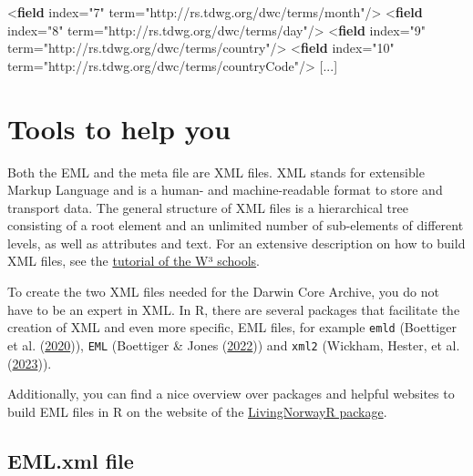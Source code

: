 \documentclass[
]{book}
\newenvironment{Shaded}{\begin{snugshade}}{\end{snugshade}}
\newcommand{\KeywordTok}[1]{\textcolor[rgb]{0.13,0.29,0.53}{\textbf{#1}}}
\newcommand{\NormalTok}[1]{#1}
\newcommand{\OtherTok}[1]{\textcolor[rgb]{0.56,0.35,0.01}{#1}}
\newcommand{\StringTok}[1]{\textcolor[rgb]{0.31,0.60,0.02}{#1}}
\begin{document}
\begin{Shaded}
\begin{Highlighting}[]
\NormalTok{    \textless{}}\KeywordTok{field}\OtherTok{ index=}\StringTok{"7"}\OtherTok{ term=}\StringTok{"http://rs.tdwg.org/dwc/terms/month"}\NormalTok{/\textgreater{}}
\NormalTok{    \textless{}}\KeywordTok{field}\OtherTok{ index=}\StringTok{"8"}\OtherTok{ term=}\StringTok{"http://rs.tdwg.org/dwc/terms/day"}\NormalTok{/\textgreater{}}
\NormalTok{    \textless{}}\KeywordTok{field}\OtherTok{ index=}\StringTok{"9"}\OtherTok{ term=}\StringTok{"http://rs.tdwg.org/dwc/terms/country"}\NormalTok{/\textgreater{}}
\NormalTok{    \textless{}}\KeywordTok{field}\OtherTok{ index=}\StringTok{"10"}\OtherTok{ term=}\StringTok{"http://rs.tdwg.org/dwc/terms/countryCode"}\NormalTok{/\textgreater{}}
\NormalTok{    [...]}
\end{Highlighting}
\end{Shaded}

\hypertarget{tools-to-help-you-5}{%
\section{Tools to help you}\label{tools-to-help-you-5}}

Both the EML and the meta file are XML files. XML stands for extensible Markup Language and is a human- and machine-readable format to store and transport data. The general structure of XML files is a hierarchical tree consisting of a root element and an unlimited number of sub-elements of different levels, as well as attributes and text. For an extensive description on how to build XML files, see the \href{https://www.w3schools.com/xml/default.asp}{tutorial of the W³ schools}.

To create the two XML files needed for the Darwin Core Archive, you do not have to be an expert in XML. In R, there are several packages that facilitate the creation of XML and even more specific, EML files, for example \texttt{emld} (Boettiger et al. (\protect\hyperlink{ref-R-emld}{2020})), \texttt{EML} (Boettiger \& Jones (\protect\hyperlink{ref-R-EML}{2022})) and \texttt{xml2} (Wickham, Hester, et al. (\protect\hyperlink{ref-R-xml2}{2023})).

Additionally, you can find a nice overview over packages and helpful websites to build EML files in R on the website of the \href{https://livingnorway.github.io/LivingNorwayR/articles/EML_R_packages_overview.html}{LivingNorwayR package}.

\hypertarget{eml.xml-file}{%
\subsection{EML.xml file}\label{eml.xml-file}}
\end{document}
